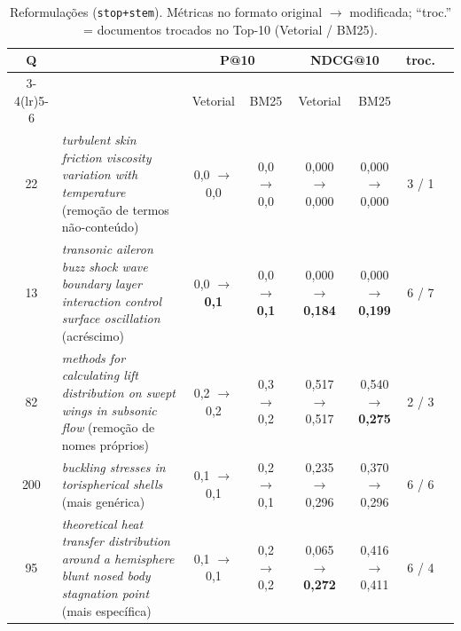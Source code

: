 \documentclass[10pt,a4paper]{article}
\begin{document}
\begin{table}[h]
\centering\footnotesize
\setlength{\tabcolsep}{3.5pt}
\caption{Reformulações (\texttt{stop+stem}). Métricas no formato original $\to$ modificada;
``troc.'' = documentos trocados no Top-10 (Vetorial / BM25).}
\label{tab:reform}
\begin{tabular}{c>{\raggedright\arraybackslash}p{5.6cm}cccccc}
\toprule
\multirow{2}{*}{Q} & \multirow{2}{*}{Consulta modificada (tipo)} & \multicolumn{2}{c}{P@10} & \multicolumn{2}{c}{NDCG@10} & \multirow{2}{*}{troc.} \\
\cmidrule(lr){3-4}\cmidrule(lr){5-6}
 & & Vetorial & BM25 & Vetorial & BM25 & \\
\midrule
22  & \emph{turbulent skin friction viscosity variation with temperature} (remoção de termos não-conteúdo)
    & 0,0 $\to$ 0,0 & 0,0 $\to$ 0,0 & 0,000 $\to$ 0,000 & 0,000 $\to$ 0,000 & 3 / 1 \\
13  & \emph{transonic aileron buzz shock wave boundary layer interaction control surface oscillation} (acréscimo)
    & 0,0 $\to$ \textbf{0,1} & 0,0 $\to$ \textbf{0,1} & 0,000 $\to$ \textbf{0,184} & 0,000 $\to$ \textbf{0,199} & 6 / 7 \\
82  & \emph{methods for calculating lift distribution on swept wings in subsonic flow} (remoção de nomes próprios)
    & 0,2 $\to$ 0,2 & 0,3 $\to$ 0,2 & 0,517 $\to$ 0,517 & 0,540 $\to$ \textbf{0,275} & 2 / 3 \\
200 & \emph{buckling stresses in torispherical shells} (mais genérica)
    & 0,1 $\to$ 0,1 & 0,2 $\to$ 0,1 & 0,235 $\to$ 0,296 & 0,370 $\to$ 0,296 & 6 / 6 \\
95  & \emph{theoretical heat transfer distribution around a hemisphere blunt nosed body stagnation point} (mais específica)
    & 0,1 $\to$ 0,1 & 0,2 $\to$ 0,2 & 0,065 $\to$ \textbf{0,272} & 0,416 $\to$ 0,411 & 6 / 4 \\
\bottomrule
\end{tabular}
\end{table}
\end{document}
